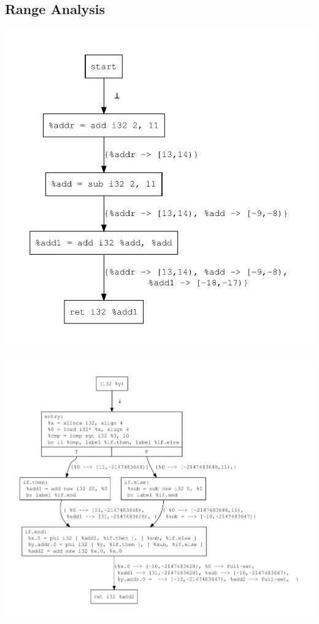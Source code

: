 \documentclass{article}
\theoremstyle{definition}
\begin{document}
\subsection{Range Analysis}
\begin{center}
  \includegraphics[scale=.4]{figures/ra/simple_add/simple_add.pdf}
\end{center}
\begin{center}
  \includegraphics[scale=.4]{figures/ra/simple_branch/simple_branch.pdf}
\end{center}
\end{document}
